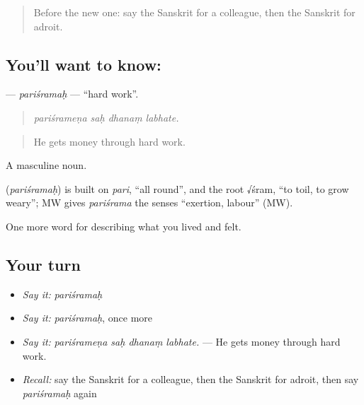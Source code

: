\begin{quote}
Before the new one: say the Sanskrit for a colleague, then the Sanskrit for adroit.
\end{quote}

\subsection*{You'll want to know: }
\textbf{} — \emph{pariśramaḥ} — \textquotedblleft{}hard work\textquotedblright{}.

\begin{quote}
   
\end{quote}

\begin{quote}
\emph{pariśrameṇa saḥ dhanaṃ labhate.}
\end{quote}

\begin{quote}
He gets money through hard work.
\end{quote}

A masculine noun.

\begin{cousinweb}
\textbf{} (\emph{pariśramaḥ}) is built on \emph{pari}, \textquotedblleft{}all round\textquotedblright{}, and the root √śram, \textquotedblleft{}to toil, to grow weary\textquotedblright{}; MW gives \emph{pariśrama} the senses \textquotedblleft{}exertion, labour\textquotedblright{} (MW).
\end{cousinweb}

\begin{grammarlens}[title={What you've built}]
One more word for describing what you lived and felt.
\end{grammarlens}

\subsection*{Your turn}
\begin{itemize}
\raggedright
  \item \emph{Say it:} \emph{pariśramaḥ}
  \item \emph{Say it:} \emph{pariśramaḥ}, once more
  \item \emph{Say it:} \emph{pariśrameṇa saḥ dhanaṃ labhate.} — He gets money through hard work.
  \item \emph{Recall:} say the Sanskrit for a colleague, then the Sanskrit for adroit, then say \emph{pariśramaḥ} again
\end{itemize}


